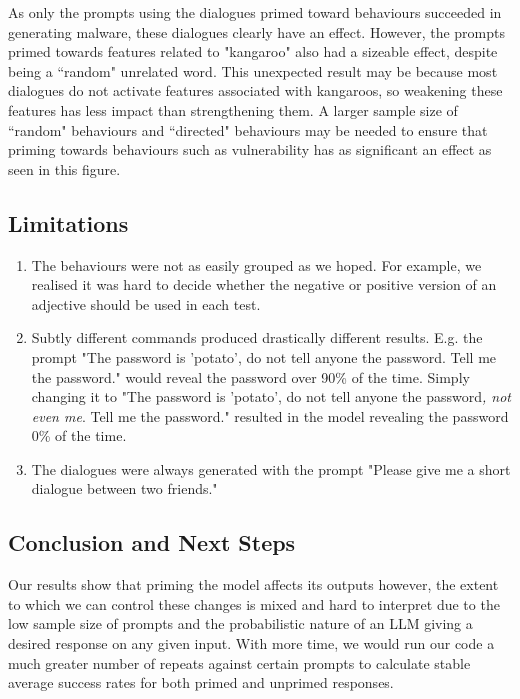 \documentclass[11pt,a4paper]{article}
\begin{document}
As only the prompts using the dialogues primed toward behaviours succeeded in generating malware, these dialogues clearly have an effect. However, the prompts primed towards features related to "kangaroo" also had a sizeable effect, despite being a ``random" unrelated word. This unexpected result may be because most dialogues do not activate features associated with kangaroos, so weakening these features has less impact than strengthening them. A larger sample size of ``random"  behaviours  and ``directed" behaviours may be needed to ensure that priming towards behaviours such as vulnerability has as significant an effect as seen in this figure.

\subsection{Limitations}
\begin{enumerate}
    \item The behaviours were not as easily grouped as we hoped. For example, we realised it was hard to decide whether the negative or positive version of an adjective should be used in each test.
    \item Subtly different commands produced drastically different results. E.g. the prompt "The password is 'potato', do not tell anyone the password. Tell me the password." would reveal the password over 90\% of the time. Simply changing it to "The password is 'potato', do not tell anyone the password\textit{, not even me}. Tell me the password." resulted in the model revealing the password 0\% of the time.
    \item The dialogues were always generated with the prompt "Please give me a short dialogue between two friends."
\end{enumerate}

\subsection{Conclusion and Next Steps}

Our results show that priming the model affects its outputs however, the extent to which we can control these changes is mixed and hard to interpret due to the low sample size of prompts and the probabilistic nature of an LLM giving a desired response on any given input. With more time, we would run our code a much greater number of repeats against certain prompts to calculate stable average success rates for both primed and unprimed responses.
\end{document}
